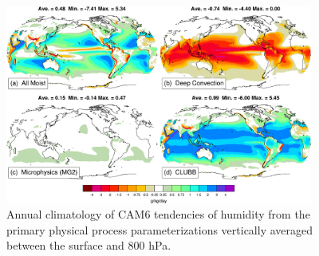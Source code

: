 \clearpage
\begin{figure}[t]
  \begin{center}
    \includegraphics[width=0.9\textwidth,angle=0.]{./figs/f_dqdt_pbl_2d_cam6_ann.pdf}
  \end{center}
  \caption{Annual climatology of CAM6 tendencies of humidity from the primary physical process parameterizations vertically averaged between the surface and 800 hPa.} 
\label{f_dqdt_pbl_2d_cam6_ann}
\end{figure} 

